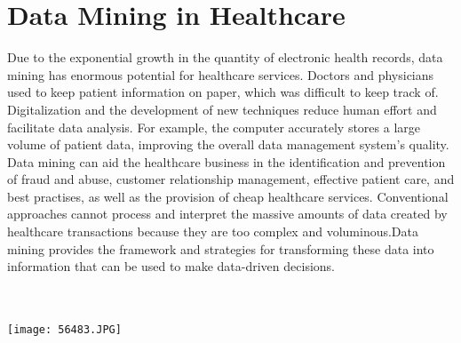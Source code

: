 \documentclass[12pt,letterpaper]{article}
\begin{document}
\section{Data Mining in Healthcare}
Due to the exponential growth in the quantity of electronic health records, data mining has enormous potential for healthcare services. Doctors and physicians used to keep patient information on paper, which was difficult to keep track of. Digitalization and the development of new techniques reduce human effort and facilitate data analysis. For example, the computer accurately stores a large volume of patient data, improving the overall data management system's quality. Data mining can aid the healthcare business in the identification and prevention of fraud and abuse, customer relationship management, effective patient care, and best practises, as well as the provision of cheap healthcare services. Conventional approaches cannot process and interpret the massive amounts of data created by healthcare transactions because they are too complex and voluminous.Data mining provides the framework and strategies for transforming these data into information that can be used to make data-driven decisions.\\
\\
 \\ \begin{center} \texttt{[image: 56483.JPG]}
\end{center}\\
\\
\end{document}
